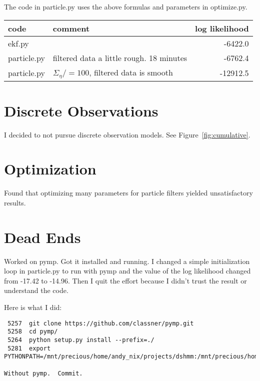 \documentclass[12pt]{article}
\begin{document}
The code in particle.py uses the above formulas and parameters in
optimize.py.

\begin{tabular}[t]{l|l|r}
  code&comment&log likelihood \\ \hline
  ekf.py & & -6422.0 \\
  particle.py & filtered data a little rough. 18 minutes &
                                                               -6762.4 \\
  particle.py & $\Sigma_\eta /= 100$, filtered data is smooth &
                                                               -12912.5 \\
\end{tabular}

\section{Discrete Observations}
\label{sec:DiscreteObservations}

I decided to not pursue discrete observation models.  See
Figure~\ref{fig:cumulative}.

\section{Optimization}
\label{sec:Optimization}

Found that optimizing many parameters for particle filters yielded
unsatisfactory results.


\section{Dead Ends}
\label{sec:DeadEnds}

Worked on pymp.  Got it installed and running.  I changed a simple
initialization loop in particle.py to run with pymp and the value of
the log likelihood changed from -17.42 to -14.96.  Then I quit the
effort because I didn't trust the result or understand the code.

Here is what I did:
\begin{verbatim}
 5257  git clone https://github.com/classner/pymp.git
 5258  cd pymp/
 5264  python setup.py install --prefix=./
 5281  export PYTHONPATH=/mnt/precious/home/andy_nix/projects/dshmm:/mnt/precious/home/andy_nix/projects/proj_hmm/src:/mnt/precious/home/andy_nix/projects/dshmm:/mnt/precious/home/andy_nix/projects/dshmm/pymp:

Without pymp.  Commit.
\end{verbatim}
\end{document}

